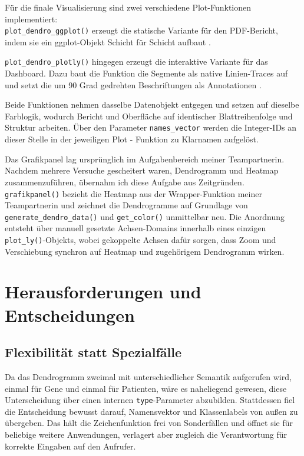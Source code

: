 \documentclass[11pt,a4paper]{article}
\newcommand{\code}[1]{\texttt{#1}}
\begin{document}
	Für die finale Visualisierung sind zwei verschiedene Plot-Funktionen implementiert:       \\
	\code{plot\_dendro\_ggplot()} erzeugt die statische Variante für den PDF-Bericht, 
	indem sie ein ggplot-Objekt Schicht für Schicht aufbaut \cite{ggplot2_book}.
	
	\code{plot\_dendro\_plotly()} hingegen erzeugt die interaktive Variante für das Dashboard. Dazu baut die Funktion die Segmente als native Linien-Traces auf und setzt die um 90 Grad gedrehten Beschriftungen als Annotationen \cite{plotly_book}.
	
	Beide Funktionen nehmen dasselbe Datenobjekt entgegen und setzen auf dieselbe Farblogik, 
	wodurch Bericht und Oberfläche auf identischer Blattreihenfolge und Struktur 
	arbeiten. Über den Parameter \code{names\_vector} werden die Integer-IDs an dieser 
	Stelle in der jeweiligen Plot - Funktion zu Klarnamen aufgelöst.
	
	Das Grafikpanel lag ursprünglich im Aufgabenbereich meiner Teampartnerin. Nachdem mehrere Versuche gescheitert waren, Dendrogramm und Heatmap zusammenzuführen, übernahm ich diese Aufgabe aus Zeitgründen. \code{grafikpanel()} bezieht die Heatmap aus der Wrapper-Funktion meiner Teampartnerin und zeichnet die Dendrogramme auf Grundlage von \code{generate\_dendro\_data()} und \code{get\_color()} unmittelbar neu. Die Anordnung entsteht über manuell gesetzte Achsen-Domains innerhalb eines einzigen \code{plot\_ly()}-Objekts, wobei gekoppelte Achsen dafür sorgen, dass Zoom und Verschiebung synchron auf Heatmap und zugehörigem Dendrogramm wirken.
	
	\section{Herausforderungen und Entscheidungen}
	
	\subsection{Flexibilität statt Spezialfälle}
	
	Da das Dendrogramm zweimal mit unterschiedlicher Semantik aufgerufen wird, einmal 
	für Gene und einmal für Patienten, wäre es naheliegend gewesen, diese Unterscheidung 
	über einen internen \code{type}-Parameter abzubilden. Stattdessen fiel die 
	Entscheidung bewusst darauf, Namensvektor und Klassenlabels von außen zu übergeben. 
	Das hält die Zeichenfunktion frei von Sonderfällen und öffnet sie für beliebige 
	weitere Anwendungen, verlagert aber zugleich die Verantwortung für korrekte 
	Eingaben auf den Aufrufer.
	
\end{document}

